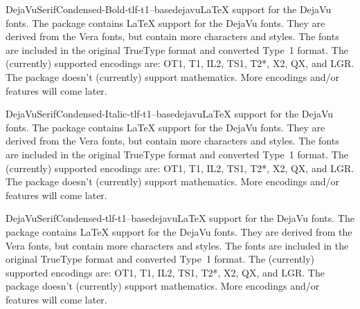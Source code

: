 \documentclass{ddltxtyp}
\begin{document}
\begin{package}{DejaVuSerifCondensed-Bold-tlf-t1--base}{dejavu}{{\LaTeX} support for the DejaVu fonts.}
The package contains {\LaTeX} support for the DejaVu fonts. They
are derived from the Vera fonts, but contain more characters
and styles. The fonts are included in the original TrueType
format and converted Type~1 format. The (currently) supported
encodings are: OT1, T1, IL2, TS1, T2*, X2, QX, and LGR. The
package doesn't (currently) support mathematics. More encodings
and/or features will come later.
\end{package}


\begin{package}{DejaVuSerifCondensed-Italic-tlf-t1--base}{dejavu}{{\LaTeX} support for the DejaVu fonts.}
The package contains {\LaTeX} support for the DejaVu fonts. They
are derived from the Vera fonts, but contain more characters
and styles. The fonts are included in the original TrueType
format and converted Type~1 format. The (currently) supported
encodings are: OT1, T1, IL2, TS1, T2*, X2, QX, and LGR. The
package doesn't (currently) support mathematics. More encodings
and/or features will come later.
\end{package}

\begin{package}{DejaVuSerifCondensed-tlf-t1--base}{dejavu}{{\LaTeX} support for the DejaVu fonts.}
The package contains {\LaTeX} support for the DejaVu fonts. They
are derived from the Vera fonts, but contain more characters
and styles. The fonts are included in the original TrueType
format and converted Type~1 format. The (currently) supported
encodings are: OT1, T1, IL2, TS1, T2*, X2, QX, and LGR. The
package doesn't (currently) support mathematics. More encodings
and/or features will come later.
\end{package}
\end{document}
